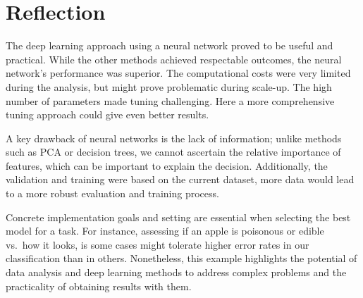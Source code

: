 \documentclass[
]{report}
\begin{document}
\section{Reflection}\label{reflection}

The deep learning approach using a neural network proved to be useful
and practical. While the other methods achieved respectable outcomes,
the neural network's performance was superior. The computational costs
were very limited during the analysis, but might prove problematic
during scale-up. The high number of parameters made tuning challenging.
Here a more comprehensive tuning approach could give even better
results.

A key drawback of neural networks is the lack of information; unlike
methods such as PCA or decision trees, we cannot ascertain the relative
importance of features, which can be important to explain the decision.
Additionally, the validation and training were based on the current
dataset, more data would lead to a more robust evaluation and training
process.

Concrete implementation goals and setting are essential when selecting
the best model for a task. For instance, assessing if an apple is
poisonous or edible vs.~how it looks, is some cases might tolerate
higher error rates in our classification than in others. Nonetheless,
this example highlights the potential of data analysis and deep learning
methods to address complex problems and the practicality of obtaining
results with them.
\end{document}
